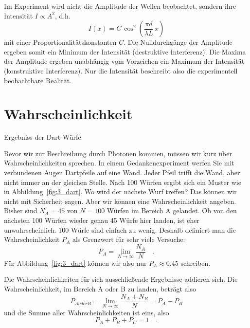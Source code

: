 Im Experiment wird nicht die Amplitude der Wellen beobachtet, sondern ihre Intensität $I \propto A^2$, d.h.
\begin{equation}
    I(x) = C \, \cos^2 \left( \frac{\pi d}{\lambda L} \, x \right)
\end{equation}
mit einer Proportionalitätskonstanten $C$. Die Nulldurchgänge der Amplitude ergeben somit ein Minimum der Intensität (destruktive Interferenz). Die Maxima der Amplitude ergeben unabhängig vom Vorzeichen ein Maximum der Intensität (konstruktive Interferenz). Nur die Intensität beschreibt also die experimentell beobachtbare Realität.


\section{Wahrscheinlichkeit}

\begin{marginfigure}
    \caption{Ergebniss der Dart-Würfe}
    \label{fig:3_dart}
\end{marginfigure}


Bevor wir zur Beschreibung durch Photonen kommen, müssen wir kurz über Wahrscheinlichkeiten sprechen. In einem Gedankenexperiment werfen Sie mit verbundenen Augen Dartpfeile auf eine Wand. Jeder Pfeil trifft die Wand, aber nicht immer an der gleichen Stelle. Nach 100 Würfen ergibt sich ein Muster wie in Abbildung~\ref{fig:3_dart}. Wo wird der nächste Wurf treffen? Das können wir nicht mit Sicherheit sagen. Aber wir können eine Wahrscheinlichkeit angeben. Bisher sind $N_A =45$ von $N = 100$ Würfen im Bereich A gelandet. Ob von den nächsten 100 Würfen wieder genau 45 Würfe hier landen, ist eher unwahrscheinlich. 100 Würfe sind einfach zu wenig. Deshalb definiert man die Wahrscheinlichkeit $P_A$ als Grenzwert für sehr viele Versuche:
\begin{equation}
    P_A =  \lim_{N \rightarrow \infty} \frac{N_A}{N} \quad .
\end{equation}
Für Abbildung~\ref{fig:3_dart} können wir also nur $P_A \approx 0.45$ schreiben. 


Die Wahrscheinlichkeiten für sich ausschließende Ergebnisse addieren sich. Die Wahrscheinlichkeit, im Bereich A oder B zu landen, beträgt also
\begin{equation}
    P_{A oder B} = \lim_{N \rightarrow \infty} \frac{N_A + N_B}{N} = P_A + P_B
\end{equation}
und die Summe aller Wahrscheinlichkeiten ist eins, also 
\begin{equation}
    P_A + P_B + P_C = 1 \quad .
\end{equation}

